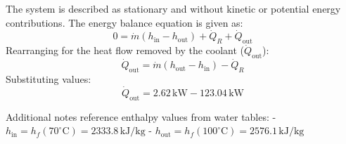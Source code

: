 The system is described as stationary and without kinetic or potential energy contributions. The energy balance equation is given as:  
\[
0 = \dot{m} (h_{\text{in}} - h_{\text{out}}) + \dot{Q}_R + \dot{Q}_{\text{out}}
\]  
Rearranging for the heat flow removed by the coolant (\( \dot{Q}_{\text{out}} \)):  
\[
\dot{Q}_{\text{out}} = \dot{m} (h_{\text{out}} - h_{\text{in}}) - \dot{Q}_R
\]  
Substituting values:  
\[
\dot{Q}_{\text{out}} = 2.62 \, \text{kW} - 123.04 \, \text{kW}
\]  

Additional notes reference enthalpy values from water tables:  
- \( h_{\text{in}} = h_{f}(70^\circ\text{C}) = 2333.8 \, \text{kJ/kg} \)  
- \( h_{\text{out}} = h_{f}(100^\circ\text{C}) = 2576.1 \, \text{kJ/kg} \)